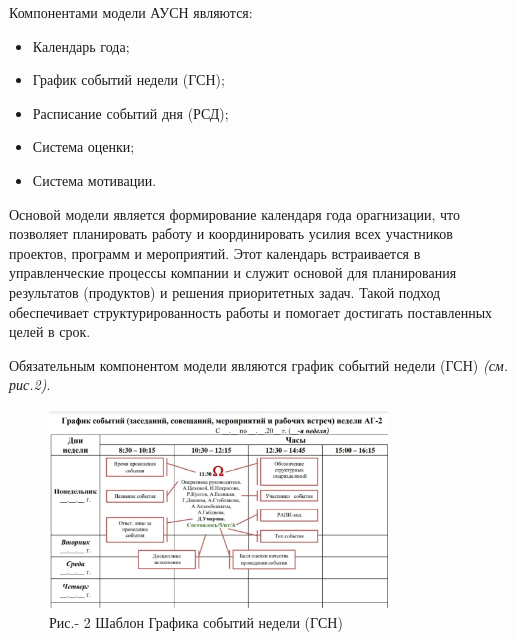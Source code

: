 \begin{multicols}{2}
Компонентами модели АУСН являются:

\begin{itemize}
\item
  Календарь года;
\item
  График событий недели (ГСН);
\item
  Расписание событий дня (РСД);
\item
  Система оценки;
\item
  Система мотивации.
\end{itemize}

Основой модели является формирование календаря года орагнизации, что
позволяет планировать работу и координировать усилия всех участников
проектов, программ и мероприятий. Этот календарь встраивается в
управленческие процессы компании и служит основой для планирования
результатов (продуктов) и решения приоритетных задач. Такой подход
обеспечивает структурированность работы и помогает достигать
поставленных целей в срок.

Обязательным компонентом модели являются график событий недели (ГСН)
\emph{(см. рис.2)}.
\end{multicols}

\begin{figure}[H]
	\centering
	\includegraphics[width=0.8\textwidth]{media/ekon/image2}
	\caption*{Рис.- 2 Шаблон Графика событий недели (ГСН)}
\end{figure}

